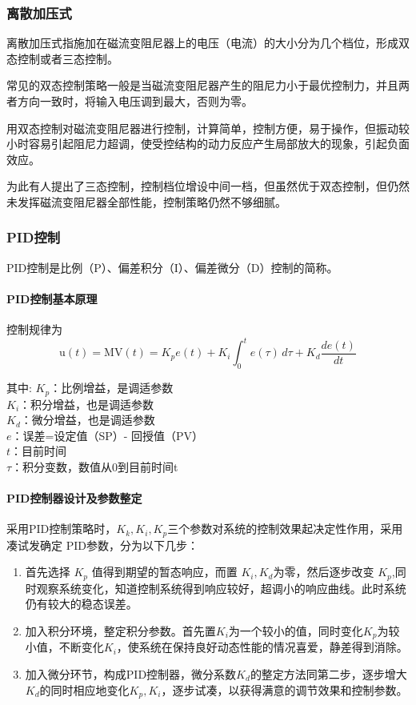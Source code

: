 \subsubsection{离散加压式}
离散加压式指施加在磁流变阻尼器上的电压（电流）的大小分为几个档位，形成双态控制或者三态控制。

常见的双态控制策略一般是当磁流变阻尼器产生的阻尼力小于最优控制力，并且两者方向一致时，将输入电压调到最大，否则为零。

用双态控制对磁流变阻尼器进行控制，计算简单，控制方便，易于操作，但振动较小时容易引起阻尼力超调，使受控结构的动力反应产生局部放大的现象，引起负面效应。

为此有人提出了三态控制，控制档位增设中间一档，但虽然优于双态控制，但仍然未发挥磁流变阻尼器全部性能，控制策略仍然不够细腻。

\subsubsection{PID控制}

PID控制是比例（P）、偏差积分（I）、偏差微分（D）控制的简称。

\paragraph{PID控制基本原理}
\qquad 控制规律为
\[\mathrm{u}(t)=\mathrm{MV}(t)=K_p{e(t)} + K_{i}\int_{0}^{t}{e(\tau)}\,{d\tau} + K_{d}\frac{de(t)}{dt}\]

其中:
$K_p$：比例增益，是调适参数\\
$K_i$：积分增益，也是调适参数\\
$K_d$：微分增益，也是调适参数\\
$e$：误差=设定值（SP）- 回授值（PV）\\
$t$：目前时间\\
$\tau$：积分变数，数值从0到目前时间t

\paragraph{PID控制器设计及参数整定}
\qquad 采用PID控制策略时，$K_{k},K_{i},K_{p}$三个参数对系统的控制效果起决定性作用，采用凑试发确定 PID参数，分为以下几步：
\begin{enumerate}
\item 首先选择 $K_p$ 值得到期望的暂态响应，而置 $K_i,K_d$为零，然后逐步改变 $K_p$,同时观察系统变化，知道控制系统得到响应较好，超调小的响应曲线。此时系统仍有较大的稳态误差。
\item 加入积分环境，整定积分参数。首先置$K_i$为一个较小的值，同时变化$K_p$为较小值，不断变化$K_i$，使系统在保持良好动态性能的情况喜爱，静差得到消除。
\item 加入微分环节，构成PID控制器，微分系数$K_d$的整定方法同第二步，逐步增大$K_d$的同时相应地变化$K_p,K_i$，逐步试凑，以获得满意的调节效果和控制参数。
\end{enumerate}

